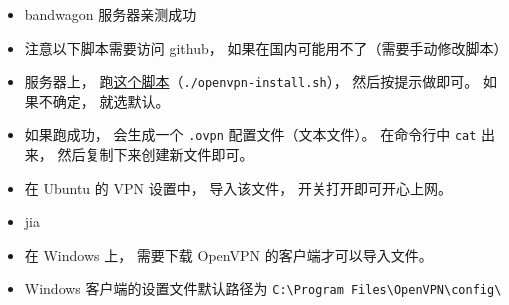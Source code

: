 
\begin{issues}
\issueDraft
\end{issues}

\begin{itemize}
\item bandwagon 服务器亲测成功
\item 注意以下脚本需要访问 github， 如果在国内可能用不了（需要手动修改脚本）
\item 服务器上， 跑\href{https://github.com/MacroUniverse/openvpn-install/blob/master/openvpn-install.sh}{这个脚本}（\verb|./openvpn-install.sh|）， 然后按提示做即可。 如果不确定， 就选默认。
\item 如果跑成功， 会生成一个 \verb|.ovpn| 配置文件（文本文件）。 在命令行中 \verb|cat| 出来， 然后复制下来创建新文件即可。
\item 在 Ubuntu 的 VPN 设置中， 导入该文件， 开关打开即可开心上网。
\item jia
\item 在 Windows 上， 需要下载 OpenVPN 的客户端才可以导入文件。
\item Windows 客户端的设置文件默认路径为 \verb|C:\Program Files\OpenVPN\config\|
\end{itemize}
